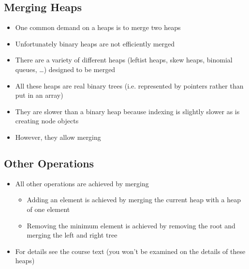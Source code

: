 
\begin{slide}
\section{Merging Heaps}

\begin{PauseHighLight}
  \begin{itemize}
  \item One common demand on a heaps is to merge two heaps\pause
  \item Unfortunately binary heaps are not efficiently merged\pause
  \item There are a variety of different heaps (leftist heaps, skew
    heaps, binomial queues, \ldots) designed to be merged\pause
  \item All these heaps are real binary trees (i.e. represented by
    pointers rather than put in an array)\pause
  \item They are slower than a binary heap because indexing is slightly
    slower as is creating node objects\pause
  \item However, they allow merging\pause
  \end{itemize}
\end{PauseHighLight}

\end{slide}


\begin{slide}
\section{Other Operations}

\begin{PauseHighLight}
  \begin{itemize}
  \item All other operations are achieved by merging
    \begin{itemize}
    \item Adding an element is achieved by merging the current heap with
      a heap of one element\pause
    \item Removing the minimum element is achieved by removing the root
      and merging the left and right tree\pause
    \end{itemize}
  \item For details see the course text (you won't be examined on the
    details of these heaps)\pause
  \end{itemize}
\end{PauseHighLight}


\end{slide}




